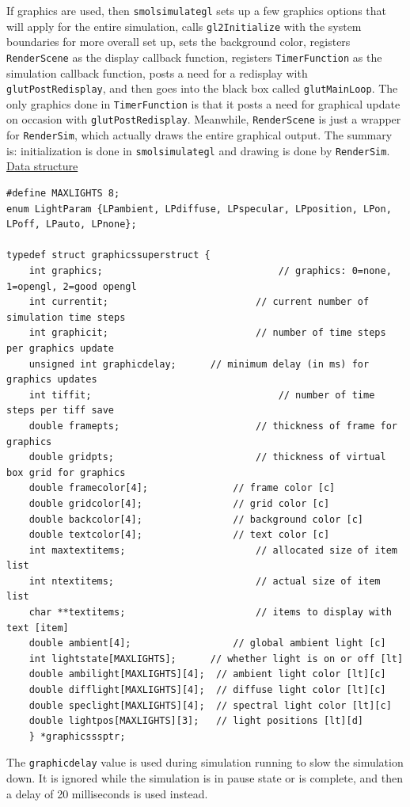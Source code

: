 \documentclass {scrbook}
\newcommand {\ttt} {\texttt}
\begin{document}
If graphics are used, then \ttt{smolsimulategl} sets up a few graphics options that will apply for the entire simulation, calls \ttt{gl2Initialize} with the system boundaries for more overall set up, sets the background color, registers \ttt{RenderScene} as the display callback function, registers \ttt{TimerFunction} as the simulation callback function, posts a need for a redisplay with \ttt{glutPostRedisplay}, and then goes into the black box called \ttt{glutMainLoop}. The only graphics done in \ttt{TimerFunction} is that it posts a need for graphical update on occasion with \ttt{glutPostRedisplay}. Meanwhile, \ttt{RenderScene} is just a wrapper for \ttt{RenderSim}, which actually draws the entire graphical output. The summary is: initialization is done in \ttt{smolsimulategl} and drawing is done by \ttt{RenderSim}.
\newline
\newline
\underline{Data structure}

\begin{lstlisting}
#define MAXLIGHTS 8;
enum LightParam {LPambient, LPdiffuse, LPspecular, LPposition, LPon, LPoff, LPauto, LPnone};

typedef struct graphicssuperstruct {
	int graphics;								// graphics: 0=none, 1=opengl, 2=good opengl
	int currentit;							// current number of simulation time steps
	int graphicit;							// number of time steps per graphics update
	unsigned int graphicdelay;		// minimum delay (in ms) for graphics updates
	int tiffit;									// number of time steps per tiff save
	double framepts;						// thickness of frame for graphics
	double gridpts;							// thickness of virtual box grid for graphics
	double framecolor[4];				// frame color [c]
	double gridcolor[4];				// grid color [c]
	double backcolor[4];				// background color [c]
	double textcolor[4];				// text color [c]
	int maxtextitems;						// allocated size of item list
	int ntextitems;							// actual size of item list
	char **textitems;						// items to display with text [item]
	double ambient[4];					// global ambient light [c]
	int lightstate[MAXLIGHTS];		// whether light is on or off [lt]
	double ambilight[MAXLIGHTS][4];	 // ambient light color [lt][c]
	double difflight[MAXLIGHTS][4];	 // diffuse light color [lt][c]
	double speclight[MAXLIGHTS][4];	 // spectral light color [lt][c]
	double lightpos[MAXLIGHTS][3];	 // light positions [lt][d]
	} *graphicsssptr;
\end{lstlisting}

The \ttt{graphicdelay} value is used during simulation running to slow the simulation down. It is ignored while the simulation is in pause state or is complete, and then a delay of 20 milliseconds is used instead.
\end{document}
